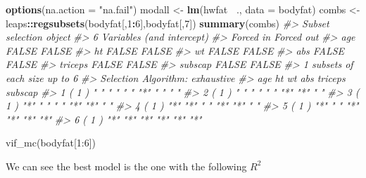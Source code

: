 \documentclass[]{article}
\newenvironment{Shaded}{\begin{snugshade}}{\end{snugshade}}
\newcommand{\CommentTok}[1]{\textcolor[rgb]{0.56,0.35,0.01}{\textit{#1}}}
\newcommand{\DataTypeTok}[1]{\textcolor[rgb]{0.13,0.29,0.53}{#1}}
\newcommand{\DecValTok}[1]{\textcolor[rgb]{0.00,0.00,0.81}{#1}}
\newcommand{\KeywordTok}[1]{\textcolor[rgb]{0.13,0.29,0.53}{\textbf{#1}}}
\newcommand{\NormalTok}[1]{#1}
\newcommand{\OperatorTok}[1]{\textcolor[rgb]{0.81,0.36,0.00}{\textbf{#1}}}
\newcommand{\StringTok}[1]{\textcolor[rgb]{0.31,0.60,0.02}{#1}}
\begin{document}
\begin{Shaded}
\begin{Highlighting}[]
\KeywordTok{options}\NormalTok{(}\DataTypeTok{na.action =} \StringTok{"na.fail"}\NormalTok{)}
\NormalTok{modall <-}\StringTok{ }\KeywordTok{lm}\NormalTok{(hwfat }\OperatorTok{~}\NormalTok{., }\DataTypeTok{data =}\NormalTok{ bodyfat)}
\NormalTok{combs <-}\StringTok{ }\NormalTok{leaps}\OperatorTok{::}\KeywordTok{regsubsets}\NormalTok{(bodyfat[,}\DecValTok{1}\OperatorTok{:}\DecValTok{6}\NormalTok{],bodyfat[,}\DecValTok{7}\NormalTok{])}
\KeywordTok{summary}\NormalTok{(combs)}
\CommentTok{#> Subset selection object}
\CommentTok{#> 6 Variables  (and intercept)}
\CommentTok{#>         Forced in Forced out}
\CommentTok{#> age         FALSE      FALSE}
\CommentTok{#> ht          FALSE      FALSE}
\CommentTok{#> wt          FALSE      FALSE}
\CommentTok{#> abs         FALSE      FALSE}
\CommentTok{#> triceps     FALSE      FALSE}
\CommentTok{#> subscap     FALSE      FALSE}
\CommentTok{#> 1 subsets of each size up to 6}
\CommentTok{#> Selection Algorithm: exhaustive}
\CommentTok{#>          age ht  wt  abs triceps subscap}
\CommentTok{#> 1  ( 1 ) " " " " " " "*" " "     " "    }
\CommentTok{#> 2  ( 1 ) " " " " " " "*" "*"     " "    }
\CommentTok{#> 3  ( 1 ) "*" " " " " "*" "*"     " "    }
\CommentTok{#> 4  ( 1 ) "*" "*" " " "*" "*"     " "    }
\CommentTok{#> 5  ( 1 ) "*" " " "*" "*" "*"     "*"    }
\CommentTok{#> 6  ( 1 ) "*" "*" "*" "*" "*"     "*"}
\end{Highlighting}
\end{Shaded}

vif\_mc(bodyfat{[}1:6{]})

\begin{Shaded}
\end{Shaded}

We can see the best model is the one with the following \(R^{2}\)

\begin{Shaded}
\end{Shaded}
\end{document}
